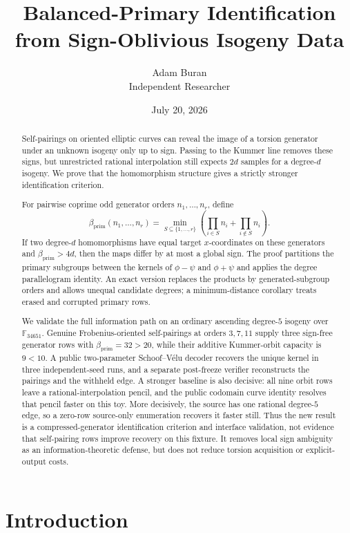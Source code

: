 \documentclass[11pt]{article}
\title{Balanced-Primary Identification\\
from Sign-Oblivious Isogeny Data}
\author{Adam Buran\\Independent Researcher}
\date{July 20, 2026}
\newcommand{\F}{\mathbb{F}}
\newcommand{\betaP}{\beta_{\mathrm{prim}}}
\begin{document}
\maketitle

\begin{abstract}
Self-pairings on oriented elliptic curves can reveal the image of a torsion
generator under an unknown isogeny only up to sign.  Passing to the Kummer
line removes these signs, but unrestricted rational interpolation still
expects $2d$ samples for a degree-$d$ isogeny.  We prove that the
homomorphism structure gives a strictly stronger identification criterion.

For pairwise coprime odd generator orders $n_1,\ldots,n_r$, define
\[
 \betaP(n_1,\ldots,n_r)=
 \min_{S\subseteq\{1,\ldots,r\}}
 \left(\prod_{i\in S}n_i+\prod_{i\notin S}n_i\right).
\]
If two degree-$d$ homomorphisms have equal target $x$-coordinates on these
generators and $\betaP>4d$, then the maps differ by at most a global sign.
The proof partitions the primary subgroups between the kernels of
$\phi-\psi$ and $\phi+\psi$ and applies the degree parallelogram identity.
An exact version replaces the products by generated-subgroup orders and
allows unequal candidate degrees; a minimum-distance corollary treats erased
and corrupted primary rows.

We validate the full information path on an ordinary ascending degree-$5$
isogeny over $\F_{34651}$.  Genuine Frobenius-oriented self-pairings at orders
$3,7,11$ supply three sign-free generator rows with $\betaP=32>20$, while
their additive Kummer-orbit capacity is $9<10$.  A public two-parameter
Schoof--V\'elu decoder recovers the unique kernel in three independent-seed
runs, and a separate post-freeze verifier reconstructs the pairings and the
withheld edge.  A stronger baseline is also decisive: all nine orbit rows
leave a rational-interpolation pencil, and the public codomain curve identity
resolves that pencil faster on this toy.  More decisively, the source has one
rational degree-$5$ edge, so a zero-row source-only enumeration recovers it
faster still.  Thus the new result is a compressed-generator identification
criterion and interface validation, not evidence that self-pairing rows
improve recovery on this fixture.  It removes local sign ambiguity as an
information-theoretic defense, but does not reduce torsion acquisition or
explicit-output costs.
\end{abstract}

\section{Introduction}
\end{document}

